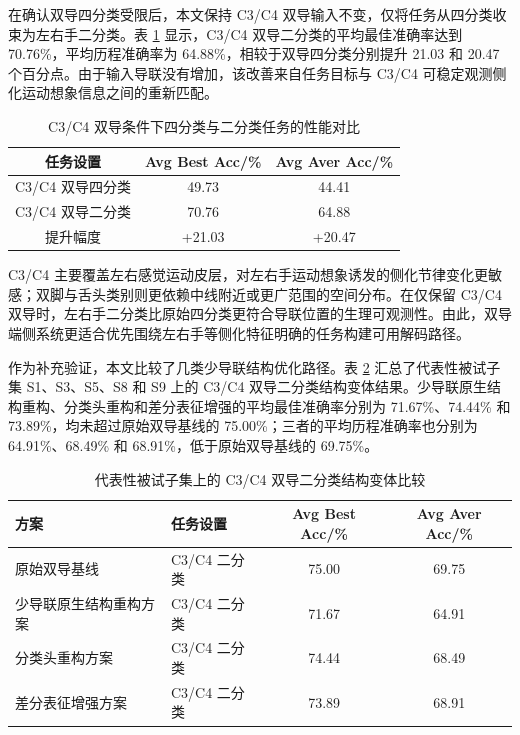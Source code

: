 在确认双导四分类受限后，本文保持 C3/C4 双导输入不变，仅将任务从四分类收束为左右手二分类。表 \ref{tab:c3c4_task_redefine} 显示，C3/C4 双导二分类的平均最佳准确率达到 70.76\%，平均历程准确率为 64.88\%，相较于双导四分类分别提升 21.03 和 20.47 个百分点。由于输入导联没有增加，该改善来自任务目标与 C3/C4 可稳定观测侧化运动想象信息之间的重新匹配。

\begin{table}[htbp]
    \centering
    \caption{C3/C4 双导条件下四分类与二分类任务的性能对比}
    \label{tab:c3c4_task_redefine}
    \begin{tabular}{ccc}
        \hline
        任务设置 & Avg Best Acc/\% & Avg Aver Acc/\% \\
        \hline
        C3/C4 双导四分类 & 49.73 & 44.41 \\
        C3/C4 双导二分类 & 70.76 & 64.88 \\
        提升幅度 & +21.03 & +20.47 \\
        \hline
    \end{tabular}
\end{table}

C3/C4 主要覆盖左右感觉运动皮层，对左右手运动想象诱发的侧化节律变化更敏感；双脚与舌头类别则更依赖中线附近或更广范围的空间分布。在仅保留 C3/C4 双导时，左右手二分类比原始四分类更符合导联位置的生理可观测性。由此，双导端侧系统更适合优先围绕左右手等侧化特征明确的任务构建可用解码路径。

作为补充验证，本文比较了几类少导联结构优化路径。表 \ref{tab:lowchannel_path_compare} 汇总了代表性被试子集 S1、S3、S5、S8 和 S9 上的 C3/C4 双导二分类结构变体结果。少导联原生结构重构、分类头重构和差分表征增强的平均最佳准确率分别为 71.67\%、74.44\% 和 73.89\%，均未超过原始双导基线的 75.00\%；三者的平均历程准确率也分别为 64.91\%、68.49\% 和 68.91\%，低于原始双导基线的 69.75\%。

\begin{table}[htbp]
    \centering
    \small
    \caption{代表性被试子集上的 C3/C4 双导二分类结构变体比较}
    \label{tab:lowchannel_path_compare}
    \begin{tabular}{p{4.1cm}p{2.3cm}cc}
        \hline
        方案 & 任务设置 & Avg Best Acc/\% & Avg Aver Acc/\% \\
        \hline
        原始双导基线 & C3/C4 二分类 & 75.00 & 69.75 \\
        少导联原生结构重构方案 & C3/C4 二分类 & 71.67 & 64.91 \\
        分类头重构方案 & C3/C4 二分类 & 74.44 & 68.49 \\
        差分表征增强方案 & C3/C4 二分类 & 73.89 & 68.91 \\
        \hline
    \end{tabular}
\end{table}

